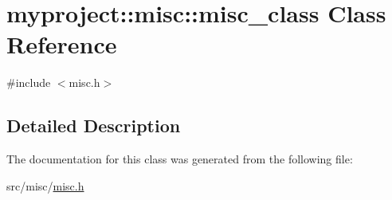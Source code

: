 \hypertarget{classmyproject_1_1misc_1_1misc__class}{}\section{myproject\+:\+:misc\+:\+:misc\+\_\+class Class Reference}
\label{classmyproject_1_1misc_1_1misc__class}


{\ttfamily \#include $<$misc.\+h$>$}



\subsection{Detailed Description}


The documentation for this class was generated from the following file\+:\begin{DoxyCompactItemize}
\item 
src/misc/\hyperlink{misc_8h}{misc.\+h}\end{DoxyCompactItemize}
